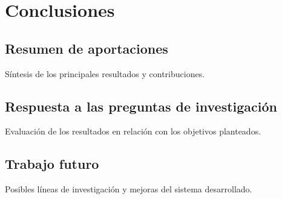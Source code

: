 \chapter{Conclusiones}

\section{Resumen de aportaciones}
Síntesis de los principales resultados y contribuciones.

\section{Respuesta a las preguntas de investigación}
Evaluación de los resultados en relación con los objetivos planteados.

\section{Trabajo futuro}
Posibles líneas de investigación y mejoras del sistema desarrollado.